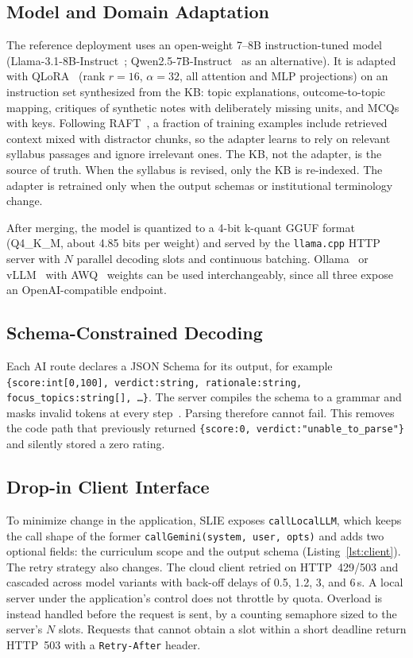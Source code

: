 \documentclass[conference]{IEEEtran}
\begin{document}
\subsection{Model and Domain Adaptation}
The reference deployment uses an open-weight 7--8B instruction-tuned model
(Llama-3.1-8B-Instruct~\cite{dubey2024llama3}; Qwen2.5-7B-Instruct~\cite{qwen2024qwen25}
as an alternative). It is adapted with QLoRA~\cite{dettmers2023qlora}
(rank $r{=}16$, $\alpha{=}32$, all attention and MLP projections) on an
instruction set synthesized from the KB: topic explanations, outcome-to-topic
mapping, critiques of synthetic notes with deliberately missing units, and
MCQs with keys. Following RAFT~\cite{zhang2024raft}, a fraction of training
examples include retrieved context mixed with distractor chunks, so the
adapter learns to rely on relevant syllabus passages and ignore irrelevant
ones. The KB, not the adapter, is the source of truth. When the syllabus is
revised, only the KB is re-indexed. The adapter is retrained only when the
output schemas or institutional terminology change.

After merging, the model is quantized to a 4-bit k-quant GGUF format
(Q4\_K\_M, about 4.85 bits per weight) and served by the \texttt{llama.cpp}
HTTP server with $N$ parallel decoding slots and continuous batching.
Ollama~\cite{ollama} or vLLM~\cite{kwon2023pagedattention} with
AWQ~\cite{lin2024awq} weights can be used interchangeably, since all three
expose an OpenAI-compatible endpoint.

\subsection{Schema-Constrained Decoding}
Each AI route declares a JSON Schema for its output, for example
\texttt{\{score:int[0,100], verdict:string, rationale:string,
focus\_topics:string[], \ldots\}}. The server compiles the schema to a
grammar and masks invalid tokens at every step~\cite{willard2023outlines}.
Parsing therefore cannot fail. This removes the code path that
previously returned \texttt{\{score:0, verdict:"unable\_to\_parse"\}} and
silently stored a zero rating.

\subsection{Drop-in Client Interface}
To minimize change in the application, SLIE exposes \texttt{callLocalLLM},
which keeps the call shape of the former \texttt{callGemini(system, user,
opts)} and adds two optional fields: the curriculum scope and the output
schema (Listing~\ref{lst:client}). The retry strategy also changes. The cloud
client retried on HTTP~429/503 and cascaded across model variants with
back-off delays of 0.5, 1.2, 3, and 6\,s. A local server under the
application's control does not throttle by quota. Overload is instead handled
before the request is sent, by a counting semaphore sized to the server's
$N$ slots. Requests that cannot obtain a slot within a short deadline return
HTTP~503 with a \texttt{Retry-After} header.
\end{document}
